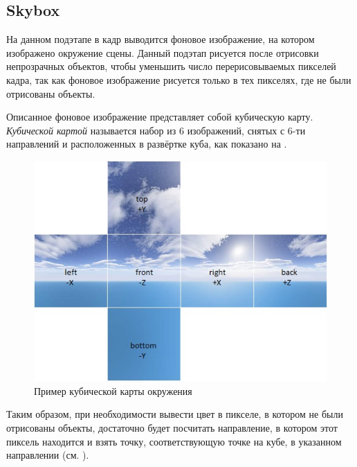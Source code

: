 	\subsection{Skybox} \label{ch3:render_pass:skybox}
		На данном подэтапе в кадр выводится фоновое изображение, на котором изображено окружение сцены. Данный подэтап рисуется после отрисовки непрозрачных объектов, чтобы уменьшить число перерисовываемых пикселей кадра, так как фоновое изображение рисуется только в тех пикселях, где не были отрисованы объекты. 
		
		Описанное фоновое изображение представляет собой кубическую карту. \textit{Кубической картой} называется набор из 6 изображений, снятых с 6-ти направлений и расположенных в развёртке куба, как показано на .
		
		\begin{figure}[ht!] 
			\center
			\includegraphics [scale=0.8] {my_folder/images//skybox}	
			\caption{Пример кубической карты окружения} 
			\label{fig:skybox}
		\end{figure}
		
		Таким образом, при необходимости вывести цвет в пикселе, в котором не были отрисованы объекты, достаточно будет посчитать направление, в котором этот пиксель находится и взять точку, соответствующую точке на кубе, в указанном направлении (см. ).
		
